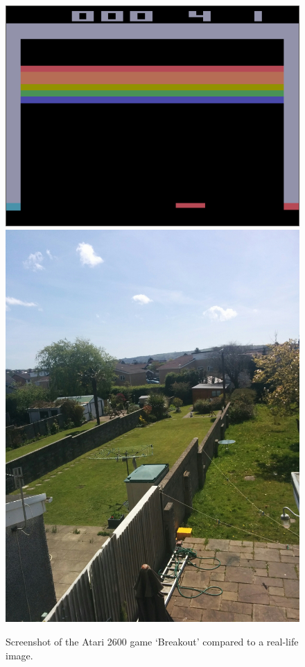 \documentclass[10pt]{article}
\begin{document}
		\begin{figure}[h]				
			\includegraphics[scale=0.5]{img/screenshot}
			\includegraphics[scale=0.06]{img/real}
			\centering
			\caption{Screenshot of the Atari 2600 game `Breakout' compared to a real-life image.}
			\label{fig:screenshot}
		\end{figure}
		
\end{document}
